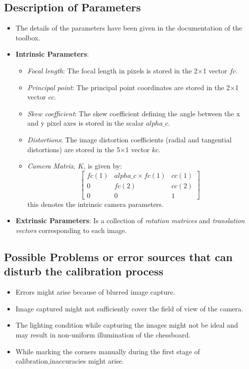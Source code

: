 \documentclass[10pt,a4paper]{article}
\begin{document}
		\subsection{Description of Parameters}
			\begin{itemize}
				\item The details of the parameters have been given in the documentation of the toolbox. \cite{paramDetails}
				\item \textbf{Intrinsic Parameters}:
					\begin{itemize}
						\item \textit{Focal length}: The focal length in pixels is stored in the 2$\times$1 vector $fc$.
						\item \textit{Principal point}: The principal point coordinates are stored in the 2$\times$1 vector $cc$.
						\item \textit{Skew coefficient}: The skew coefficient defining the angle between the x and y pixel axes is stored in the scalar $alpha\_c$.
						\item \textit{Distortions}: The image distortion coefficients (radial and tangential distortions) are stored in the 5$\times$1 vector $kc$.
						\item \textit{Camera Matrix}, $K$, is given by:
						\[
						\begin{bmatrix}
							fc(1) &     alpha\_c \times fc(1) & cc(1)\\
							0     &     fc(2)                 & cc(2)\\   
							0	  &		0					  & 1
						\end{bmatrix} 						
						\]
						this denotes the intrinsic camera parameters.
					\end{itemize}
				\item \textbf{Extrinsic Parameters}: Is a collection of \textit{rotation matrices} and \textit{translation vectors} corresponding to each image.
			\end{itemize}
		\subsection{Possible Problems or error sources that can disturb the calibration process}
			\begin{itemize}
				\item Errors might arise because of blurred image capture.
				\item Image captured might not sufficiently cover the field of view of the camera.
				\item The lighting condition while capturing the images might not be ideal and may result in non-uniform illumination of the chessboard.
				\item While marking the corners manually during the first stage of calibration,inaccuracies might arise. 
			\end{itemize}
		
\end{document}
